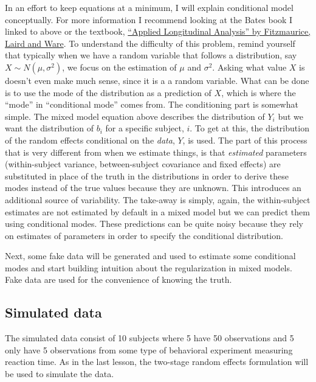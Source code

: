 \documentclass[]{book}
\begin{document}
In an effort to keep equations at a minimum, I will explain conditional
model conceptually. For more information I recommend looking at the
Bates book I linked to above or the textbook,
\href{https://www.amazon.com/Applied-Longitudinal-Analysis-Garrett-Fitzmaurice/dp/0470380276}{``Applied
Longitudinal Analysis'' by Fitzmaurice, Laird and Ware}. To understand
the difficulty of this problem, remind yourself that typically when we
have a random variable that follows a distribution, say
\(X \sim N(\mu, \sigma^2)\), we focus on the estimation of \(\mu\) and
\(\sigma^2\). Asking what value \(X\) is doesn't even make much sense,
since it is a a random variable. What can be done is to use the mode of
the distribution as a prediction of \(X\), which is where the ``mode''
in ``conditional mode'' comes from. The conditioning part is somewhat
simple. The mixed model equation above describes the distribution of
\(Y_i\) but we want the distribution of \(b_i\) for a specific subject,
\(i\). To get at this, the distribution of the random effects
conditional on the \emph{data}, \(Y\), is used. The part of this process
that is very different from when we estimate things, is that
\emph{estimated} parameters (within-subject variance, between-subject
covariance and fixed effects) are substituted in place of the truth in
the distributions in order to derive these modes instead of the true
values because they are unknown. This introduces an additional source of
variability. The take-away is simply, again, the within-subject
estimates are not estimated by default in a mixed model but we can
predict them using conditional modes. These predictions can be quite
noisy because they rely on estimates of parameters in order to specify
the conditional distribution.

Next, some fake data will be generated and used to estimate some
conditional modes and start building intuition about the regularization
in mixed models. Fake data are used for the convenience of knowing the
truth.

\subsection{Simulated data}\label{simulated-data}

The simulated data consist of 10 subjects where 5 have 50 observations
and 5 only have 5 observations from some type of behavioral experiment
measuring reaction time. As in the last lesson, the two-stage random
effects formulation will be used to simulate the data.
\end{document}
